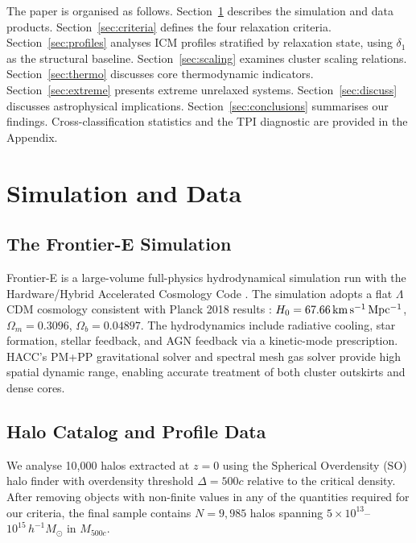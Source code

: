 \documentclass[12pt]{article}
\newcommand{\deltai}{\delta_1}
\newcommand{\Msun}{M_\odot}
\begin{document}
The paper is organised as follows.
Section~\ref{sec:data} describes the simulation and data products.
Section~\ref{sec:criteria} defines the four relaxation criteria.
Section~\ref{sec:profiles} analyses ICM profiles stratified by relaxation state,
using $\deltai$ as the structural baseline.
Section~\ref{sec:scaling} examines cluster scaling relations.
Section~\ref{sec:thermo} discusses core thermodynamic indicators.
Section~\ref{sec:extreme} presents extreme unrelaxed systems.
Section~\ref{sec:discuss} discusses astrophysical implications.
Section~\ref{sec:conclusions} summarises our findings.
Cross-classification statistics and the TPI diagnostic are provided in the Appendix.

\section{Simulation and Data}
\label{sec:data}

\subsection{The Frontier-E Simulation}

Frontier-E is a large-volume full-physics hydrodynamical simulation run with the
Hardware/Hybrid Accelerated Cosmology Code \citep[HACC;][]{hacc2016}.  The simulation
adopts a flat $\Lambda$CDM cosmology consistent with Planck 2018 results \citep{planck2018}:
$H_0 = 67.66\,{\rm km\,s^{-1}\,Mpc^{-1}}$, $\Omega_m = 0.3096$, $\Omega_b = 0.04897$.
The hydrodynamics include radiative cooling, star formation, stellar feedback, and
AGN feedback via a kinetic-mode prescription.  HACC's PM+PP gravitational solver and
spectral mesh gas solver provide high spatial dynamic range, enabling accurate treatment
of both cluster outskirts and dense cores.

\subsection{Halo Catalog and Profile Data}

We analyse 10{,}000 halos extracted at $z=0$ using the Spherical Overdensity (SO) halo
finder with overdensity threshold $\Delta = 500c$ relative to the critical density.
After removing objects with non-finite values in any of the quantities required for our
criteria, the final sample contains $N = 9{,}985$ halos spanning
$5\times10^{13}$--$10^{15}\,h^{-1}\Msun$ in $M_{500c}$.
\end{document}
